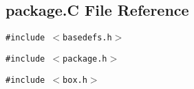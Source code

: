 \subsection{package.C File Reference}
\label{package.C}
{\tt \#include $<$basedefs.h$>$}\par
{\tt \#include $<$package.h$>$}\par
{\tt \#include $<$box.h$>$}\par
